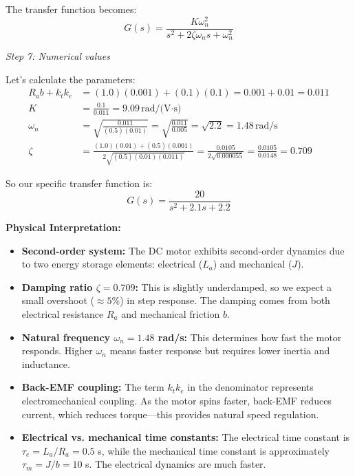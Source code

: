 \begin{example}
The transfer function becomes:
\begin{equation}
\boxed{G(s) = \frac{K\omega_n^2}{s^2 + 2\zeta\omega_n s + \omega_n^2}}
\end{equation}

\textit{Step 7: Numerical values}

Let's calculate the parameters:
\begin{align}
R_a b + k_t k_e &= (1.0)(0.001) + (0.1)(0.1) = 0.001 + 0.01 = 0.011 \\
K &= \frac{0.1}{0.011} = 9.09\,\text{rad/(V·s)} \\
\omega_n &= \sqrt{\frac{0.011}{(0.5)(0.01)}} = \sqrt{\frac{0.011}{0.005}} = \sqrt{2.2} = 1.48\,\text{rad/s} \\
\zeta &= \frac{(1.0)(0.01) + (0.5)(0.001)}{2\sqrt{(0.5)(0.01)(0.011)}} = \frac{0.0105}{2\sqrt{0.000055}} = \frac{0.0105}{0.0148} = 0.709
\end{align}

So our specific transfer function is:
\begin{equation}
\boxed{G(s) = \frac{20}{s^2 + 2.1s + 2.2}}
\end{equation}

\textbf{Physical Interpretation:}

\begin{itemize}
    \item \textbf{Second-order system:} The DC motor exhibits second-order dynamics due to two energy storage elements: electrical ($L_a$) and mechanical ($J$).

    \item \textbf{Damping ratio $\zeta = 0.709$:} This is slightly underdamped, so we expect a small overshoot ($\approx 5\%$) in step response. The damping comes from both electrical resistance $R_a$ and mechanical friction $b$.

    \item \textbf{Natural frequency $\omega_n = 1.48$ rad/s:} This determines how fast the motor responds. Higher $\omega_n$ means faster response but requires lower inertia and inductance.

    \item \textbf{Back-EMF coupling:} The term $k_t k_e$ in the denominator represents electromechanical coupling. As the motor spins faster, back-EMF reduces current, which reduces torque—this provides natural speed regulation.

    \item \textbf{Electrical vs. mechanical time constants:} The electrical time constant is $\tau_e = L_a/R_a = 0.5$ s, while the mechanical time constant is approximately $\tau_m = J/b = 10$ s. The electrical dynamics are much faster.
\end{itemize}


\end{example}

